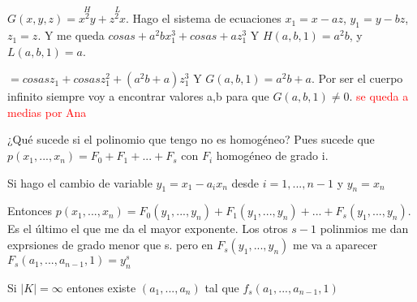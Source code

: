 \begin{example}
 $G(x,y,z)=\stackrel{H}{x^2y}+\stackrel{L}{z^2x}$. Hago el sistema de ecuaciones $x_1=x-az$, $y_1=y-bz$, $z_1=z$. Y me queda $cosas + a^2b x_1^3+cosas+ az_1^3$ Y $H(a,b,1)=a^2b$, y $L(a,b,1)=a$.
 
 $= cosas z_1+ cosas z_1^2+(a^2b+a)z_1^3$ Y $G(a,b,1)=a^2b+a$. Por ser el cuerpo infinito siempre voy a encontrar valores a,b para que $G(a,b,1) \neq 0$. \textcolor{red}{se queda a medias por Ana}
\end{example}


¿Qué sucede si el polinomio que tengo no es homogéneo? Pues sucede que $p(x_1,...,x_n)=F_0+F_1+...+F_s$ con $F_i$ homogéneo de grado i.

Si hago el cambio de variable $y_1=x_1-a_ix_n$ desde $i=1,...,n-1$ y $y_n=x_n$

Entonces $p(x_1,...,x_n)=F_0(y_1,...,y_n)+F_1(y_1,...,y_n)+...+F_s(y_1,...,y_n)$. Es el último el que me da el mayor exponente. Los otros $s-1$ polinmios me dan exprsiones de grado menor que s. pero en $F_s(y_1,...,y_n)$ me va a aparecer $F_s(a_{1},...,a_{n-1}, 1) = y_n^s$

Si $|K|= \infty$ entones existe $(a_1,...,a_n)$ tal que  $f_s(a_1,...,a_{n-1}, 1)$ 



